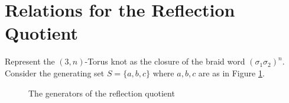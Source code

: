 \documentclass{article}
\theoremstyle{definition}
\begin{document}
\section{Relations for the Reflection Quotient}
Represent the $(3,n)$-Torus knot as the closure of the braid word $(\sigma_1 \sigma_2)^n$. Consider the generating set $S = \{a,b,c\}$ where $a,b,c$ are as in Figure \ref{fig:generators}. 

\begin{figure}[ht]
\caption{\label{fig:generators} The generators of the reflection quotient}
\end{figure}
\end{document}
